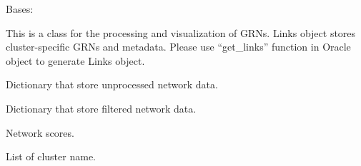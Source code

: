 \documentclass[letterpaper,10pt,english]{sphinxmanual}
\begin{document}
\begin{fulllineitems}
\label{\detokenize{modules/celloracle:celloracle.Links}}
Bases: 

This is a class for the processing and visualization of GRNs.
Links object stores cluster-specific GRNs and metadata.
Please use “get\_links” function in Oracle object to generate Links object.

\begin{fulllineitems}
\label{\detokenize{modules/celloracle:celloracle.Links.links_dict}}
 \textendash{} Dictionary that store unprocessed network data.

\end{fulllineitems}


\begin{fulllineitems}
\label{\detokenize{modules/celloracle:celloracle.Links.filtered_links}}
 \textendash{} Dictionary that store filtered network data.

\end{fulllineitems}


\begin{fulllineitems}
\label{\detokenize{modules/celloracle:celloracle.Links.merged_score}}
 \textendash{} Network scores.

\end{fulllineitems}


\begin{fulllineitems}
\label{\detokenize{modules/celloracle:celloracle.Links.cluster}}
 \textendash{} List of cluster name.

\end{fulllineitems}


\end{fulllineitems}
\end{document}
